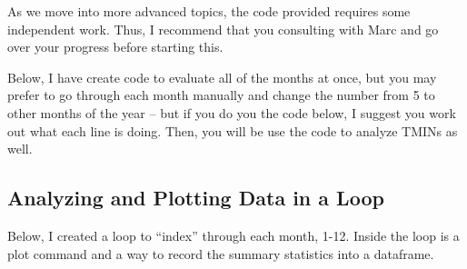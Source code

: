 \documentclass{article}\usepackage[]{graphicx}\usepackage[]{color}
\begin{document}
As we move into more advanced topics, the code provided requires some independent work. 
Thus, I recommend that you consulting with Marc and go over your progress before starting this.

Below, I have create code to evaluate all of the months at once, but you may prefer to go through each month manually and change the number from 5 to other months of the year -- but if you do you the code below, I suggest you work out what each line is doing. Then, you will be use the code to analyze TMINs as well. 


\subsection{Analyzing and Plotting Data in a Loop}
Below, I created a loop to ``index'' through each month, 1-12. Inside the loop is a plot command and a way to record the summary statistics into a dataframe.
\end{document}
